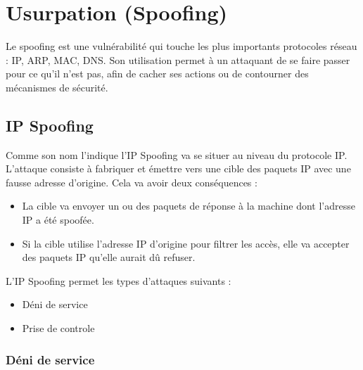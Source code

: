 

\newpage
\section{Usurpation (Spoofing)}\label{vulnerabilites:reseau:spoofing}

Le spoofing est une vulnérabilité qui touche les plus importants protocoles réseau : IP, ARP, MAC, DNS.
Son utilisation permet à un attaquant de se faire passer pour ce qu'il n'est pas, %
afin de cacher ses actions ou de contourner des mécanismes de sécurité.

\subsection{IP Spoofing}\label{vulnerabilites:reseau:spoofing:ip}

Comme son nom l'indique l'IP Spoofing va se situer au niveau du protocole IP. L'attaque consiste à fabriquer et émettre vers une cible des paquets IP avec une fausse adresse d'origine. Cela va avoir deux conséquences :
\\
\begin{itemize}
\item La cible va envoyer un ou des paquets de réponse à la machine dont l'adresse IP a été spoofée.
\item Si la cible utilise l'adresse IP d'origine pour filtrer les accès, elle va accepter des paquets IP qu'elle aurait dû refuser.
\end{itemize}

\begin{tabbing}
\end{tabbing}
L'IP Spoofing permet les types d'attaques suivants :\\

\begin{itemize}
\item Déni de service
\item Prise de controle
\end{itemize}

\subsubsection{Déni de service}\label{vulnerabilites:reseau:spoofing:ip:dos}

